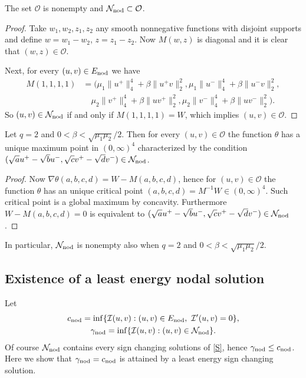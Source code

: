 \documentclass[reqno]{amsart}
\begin{document}
\begin{lemma}\label{lem:O}
 The set $\mathcal O$ is nonempty and $\mathcal N_{\rm nod}\subset \mathcal O$.
\end{lemma}

\begin{proof}
Take $w_1, w_2, z_1, z_2$ any smooth nonnegative functions with disjoint supports
and define $w=w_1-w_2$, $z=z_1-z_2$.
Now $M(w,z)$ is diagonal and it is clear that $(w,z)\in \mathcal O$.

Next,  for every $(u,v)\in E_{\rm nod}$ we have
\begin{align*}
M (1,1,1,1)
&= \Big(\mu_1\|u^+\|_{4}^{4} + \beta \|u^+v\|_2^2 ,
 \mu_1\|u^-\|_{4}^{4} + \beta \|u^-v\|_2^2 , \\
&\quad \mu_2 \|v^+\|_{4}^{4} +\beta \|uv^+\|_2^2 ,
\mu_2\|v^-\|_{4}^{4} +\beta \|uv^-\|_2^2 \Big) .
\end{align*}
So $(u,v)\in \mathcal N_{\rm nod}$ if and only if  $M(1,1,1,1)=W$, which implies
$(u,v)\in \mathcal O$.
\end{proof}

\begin{lemma}\label{prop:theta_q2}
Let $q=2$ and $0<\beta<\sqrt{\mu_1\mu_2}/2$.
Then for every $(u,v)\in  \mathcal O$  the function
$\theta$ has a unique maximum point in $ (0,\infty)^4$ characterized by the
condition $(\sqrt{a} u^+ -\sqrt{b} u^-, \sqrt{c} v^+ -\sqrt{d} v^-)
\in \mathcal N_{\rm nod}$.
\end{lemma}

\begin{proof}
Now $\nabla\theta(a,b,c,d)= W- M(a,b,c,d)$, hence for $(u,v)\in \mathcal O$ the
function $\theta $ has an unique critical point  $(a,b,c,d)= M^{-1} W \in (0,\infty)^4$.
Such critical point is a global maximum by concavity.
Furthermore $W-M(a,b,c,d)=0$ is equivalent to
$(\sqrt{a} u^+ -\sqrt{b} u^-, \sqrt{c} v^+ -\sqrt{d} v^-) \in \mathcal N_{\rm nod}$.
\end{proof}

In particular, $\mathcal N_{\rm nod}$ is nonempty also when $q=2$ and
$0<\beta<\sqrt{\mu_1\mu_2}/2$.

\subsection{Existence of a least energy nodal solution}\label{sub:existence_lesc}
Let
\begin{gather}
c_{\rm nod} =\inf \{ \mathcal I(u,v) : (u,v)\in E_{\rm nod} , \  \mathcal I'(u,v)=0\}, \\
\gamma_{\rm nod} =\inf \{ \mathcal I(u,v) : (u,v)\in \mathcal N_{\rm nod} \}.
\end{gather}
Of course $\mathcal N_{\rm nod}$ contains every sign changing solutions of \eqref{S},
hence $\gamma_{\rm nod} \le c_{\rm nod}$. Here we show that
$\gamma_{\rm nod}=c_{\rm nod}$ is attained by a least energy sign changing solution.
\end{document}
